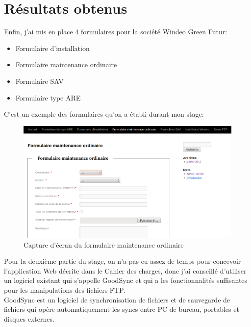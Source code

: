 \section{Résultats obtenus}
Enfin, j'ai mis en place 4 formulaires pour la société Windeo Green Futur:\\

\begin{itemize}
\item Formulaire d’installation
\item Formulaire maintenance ordinaire
\item Formulaire SAV
\item Formulaire type ARE\\
\end{itemize} 

C'est un exemple des formulaires qu'on a établi durant mon stage:

\begin{figure}[!htbp]
  \centering
    \includegraphics[width=\textwidth]{images/resultat}
  \caption{Capture d'écran du formulaire maintenance ordinaire}
\end{figure}

\newpage

Pour la deuxième partie du stage, on n'a pas eu assez de temps pour concevoir l'application Web décrite dans le Cahier des charges, donc j'ai conseillé d'utiliser un logiciel existant qui s'appelle GoodSync et qui a les fonctionnalités suffisantes pour les manipulations des fichiers FTP.\\

GoodSync est un logiciel de synchronisation de fichiers et de sauvegarde de fichiers qui opère automatiquement les syncs entre PC de bureau, portables et disques externes.\\

